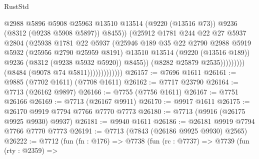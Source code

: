 \begin{lexlean}{RustStd}
\begin{coremodule}
                                            @2988
                                            @5896
                                            @5908
                                            @25963
                                            @13510
                                            @13514
                                            (@9220 (@13516 @73))
                                            @9236
                                            (@8312 (@9238 @5908 @5897))
                                            @8455))
                                        (@25912
                                          @1781
                                          @244
                                          @22
                                          @27
                                          @5937
                                          @2804
                                          (@25938
                                            @1781
                                            @22
                                            @5937
                                            (@25946
                                              @189
                                              @35
                                              @22
                                              @2790
                                              @2988
                                              @5919
                                              @5932
                                              (@25956 @2790 @25959 @8191)
                                              @13510
                                              @13514
                                              (@9220 (@13516 @189))
                                              @9236
                                              (@8312 (@9238 @5932 @5920))
                                              @8455))
                                          (@8282 @25879 @2535)))))))))
                          (@8484 (@9078 @74 @5811)))))))))))))
@26157 := @7696 @1611
@26161 := @9885 (@7702 @1611) (@7708 @1611)
@26162 := @7717 @23790
@26164 := @7713 (@26162 @9897)
@26166 := @7755 (@7756 @1611)
@26167 := @7751 @26166
@26169 := @7713 (@26167 @9911)
@26170 := @9917 @1611
@26175 := @26170 @9919 @7794 @7766 @7770 @7773
@26180 := @7713 (@9916 (@26175 @9925 @9930) @9937)
@26181 := @9940 @1611
@26186 := @26181 @9919 @7794 @7766 @7770 @7773
@26191 := @7713 (@7843 (@26186 @9925 @9930) @2565)
@26222 := @7712
    (fun (fn : @176) =>
    @7738
      (fun (rc : @7737) =>
      @7739
        (fun (rty : @2359) =>

\end{coremodule}
\end{lexlean}
